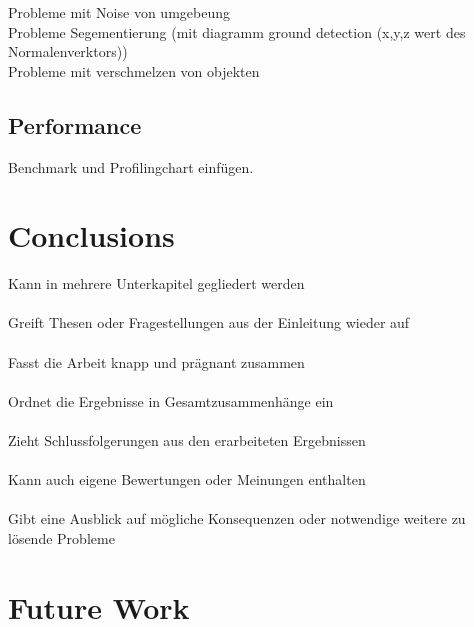 \documentclass[11pt,oneside,openright]{mpreport}
\begin{document}
Probleme mit Noise von umgebeung\\

Probleme Segementierung (mit diagramm ground detection (x,y,z wert des Normalenverktors))\\

Probleme mit verschmelzen von objekten\\


\section{Performance}

Benchmark und Profilingchart einfügen.\\




\chapter{Conclusions}
Kann in mehrere Unterkapitel gegliedert werden\\\\
Greift Thesen oder Fragestellungen aus der Einleitung wieder auf\\\\
Fasst die Arbeit knapp und prägnant zusammen\\\\
Ordnet die Ergebnisse in Gesamtzusammenhänge ein\\\\
Zieht Schlussfolgerungen aus den erarbeiteten Ergebnissen\\\\
Kann auch eigene Bewertungen oder Meinungen enthalten\\\\
Gibt eine Ausblick auf mögliche Konsequenzen oder notwendige weitere zu lösende Probleme
\chapter{Future Work}

\printbibliography
\end{document}
